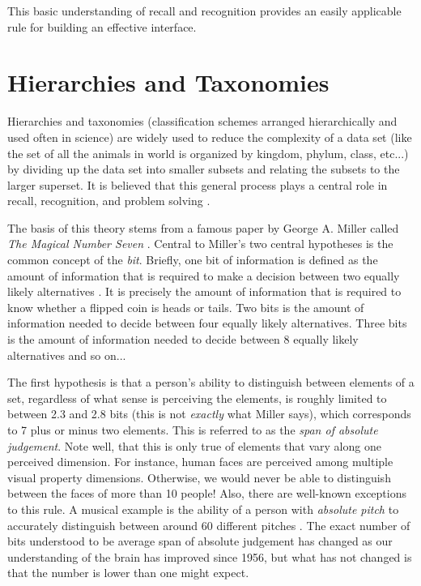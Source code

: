 This basic understanding of recall and recognition provides an easily applicable rule for building an effective interface.

\section{Hierarchies and Taxonomies}

\begin{comment}
Papers:
Magic number seven, George Miller
recoding pg. 93
increasing bits per chunk
The Structure of the Information Visualization Design Space, Section 2
enclosure
Coding Recoding Hierarchical Information
Acquisiton and forgetting of hierarchically organized information
\end{comment}

Hierarchies and taxonomies (classification schemes arranged hierarchically and used often in science) are widely used to reduce the complexity of a data set (like the set of all the animals in world is organized by kingdom, phylum, class, etc...) by dividing up the data set into smaller subsets and relating the subsets to the larger superset. It is believed that this general process plays a central role in recall, recognition, and problem solving \cite{seven1956}\cite{graphicalhierarchy1972}\cite{hierarchical1971}. 

The basis of this theory stems from a famous paper by George A. Miller called \emph{The Magical Number Seven} \cite{seven1956}. Central to Miller's two central hypotheses is the common concept of the \emph{bit}. Briefly, one bit of information is defined as the amount of information that is required to make a decision between two equally likely alternatives \cite{seven1956}. It is precisely the amount of information that is required to know whether a flipped coin is heads or tails. Two bits is the amount of information needed to decide between four equally likely alternatives. Three bits is the amount of information needed to decide between 8 equally likely alternatives and so on...

The first hypothesis is that a person's ability to distinguish between elements of a set, regardless of what sense is perceiving the elements, is roughly limited to between 2.3 and 2.8 bits (this is not \emph{exactly} what Miller says), which corresponds to 7 plus or minus two elements. This is referred to as the \emph{span of absolute judgement}. Note well, that this is only true of elements that vary along one perceived dimension. For instance, human faces are perceived among multiple visual property dimensions. Otherwise, we would never be able to distinguish between the faces of more than 10 people! Also, there are well-known exceptions to this rule. A musical example is the ability of a person with \emph{absolute pitch} to accurately distinguish between around 60 different pitches \cite{seven1956}. The exact number of bits understood to be average span of absolute judgement has changed as our understanding of the brain has improved since 1956, but what has not changed is that the number is lower than one might expect. 

